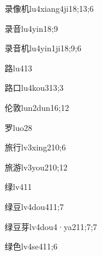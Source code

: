 \begin{verbete}{录像机}{lu4xiang4ji1}{8;13;6}
\end{verbete}
\begin{verbete}{录音}{lu4yin1}{8;9}
\end{verbete}
\begin{verbete}{录音机}{lu4yin1ji1}{8;9;6}
\end{verbete}
\begin{verbete}{路}{lu4}{13}
\end{verbete}
\begin{verbete}{路口}{lu4kou3}{13;3}
\end{verbete}
\begin{verbete}{伦敦}{lun2dun1}{6;12}
\end{verbete}
\begin{verbete}{罗}{luo2}{8}
\end{verbete}
\begin{verbete}{旅行}{lv3xing2}{10;6}
\end{verbete}
\begin{verbete}{旅游}{lv3you2}{10;12}
\end{verbete}
\begin{verbete}{绿}{lv4}{11}
\end{verbete}
\begin{verbete}{绿豆}{lv4dou4}{11;7}
\end{verbete}
\begin{verbete}{绿豆芽}{lv4dou4·ya2}{11;7;7}
\end{verbete}
\begin{verbete}{绿色}{lv4se4}{11;6}
\end{verbete}


